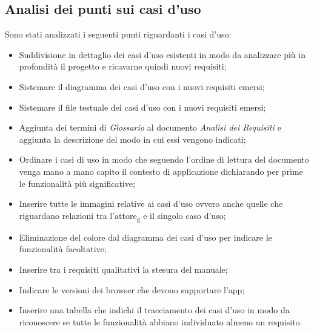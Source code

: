 \subsection{Analisi dei punti sui casi d'uso}
Sono stati analizzati i seguenti punti riguardanti i casi d'uso:
\begin{itemize}
    \item Suddivisione in dettaglio dei casi d'uso esistenti in modo da analizzare più in profondità il progetto e ricavarne quindi nuovi requisiti;
    \item Sistemare il diagramma dei casi d'uso con i nuovi requisiti emersi;
    \item Sistemare il file testuale dei casi d'uso con i nuovi requisiti emersi;
    \item Aggiunta dei termini di \textit{Glossario} al documento \textit{Analisi dei Requisiti} e aggiunta la descrizione del modo in cui essi vengono indicati;
    \item Ordinare i casi di uso in modo che seguendo l'ordine di lettura del documento venga mano a mano capito il contesto di applicazione dichiarando per prime le funzionalità più significative;
    \item Inserire tutte le immagini relative ai casi d'uso ovvero anche quelle che riguardano relazioni tra l'attore\textsubscript{g} e il singolo caso d'uso;
    \item Eliminazione del colore dal diagramma dei casi d'uso per indicare le funzionalità facoltative;
    \item Inserire tra i requisiti qualitativi la stesura del manuale;
    \item Indicare le versioni dei browser che devono supportare l'app;
    \item Inserire una tabella che indichi il tracciamento dei casi d'uso in modo da riconoscere se tutte le funzionalità abbiano individuato almeno un requisito.
\end{itemize}
